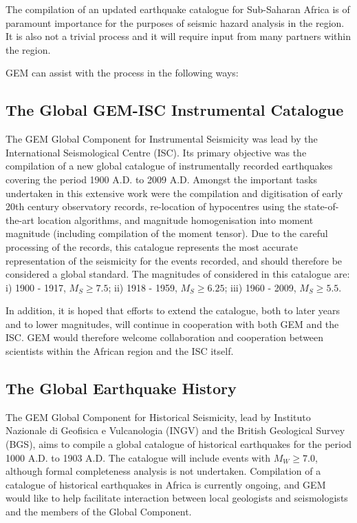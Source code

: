 The compilation of an updated earthquake catalogue for Sub-Saharan Africa is of paramount importance for the purposes of seismic hazard analysis in the region. It is also not a trivial process and it will require input from many partners within the region. 

GEM can assist with the process in the following ways:

\subsection{The Global GEM-ISC Instrumental Catalogue}

The GEM Global Component for Instrumental Seismicity was lead by the International Seismological Centre (ISC). Its primary objective was the compilation of a new global catalogue of instrumentally recorded earthquakes covering the period 1900 A.D. to 2009 A.D. Amongst the important tasks undertaken in this extensive work were the compilation and digitisation of early 20th century observatory records, re-location of hypocentres using the state-of-the-art location algorithms, and magnitude homogenisation into moment magnitude (including compilation of the moment tensor). Due to the careful processing of the records, this catalogue represents the most accurate representation of the seismicity for the events recorded, and should therefore be considered a global standard. The magnitudes of considered in this catalogue are: i) 1900 - 1917, $M_S \geq 7.5$; ii) 1918 - 1959, $M_S \geq 6.25$; iii) 1960 - 2009, $M_S \geq 5.5$. 

In addition, it is hoped that efforts to extend the catalogue, both to later years and to lower magnitudes, will continue in cooperation with both GEM and the ISC. GEM would therefore welcome collaboration and cooperation between scientists within the African region and the ISC itself.

\subsection{The Global Earthquake History}

The GEM Global Component for Historical Seismicity, lead by Instituto Nazionale di Geofisica e Vulcanologia (INGV) and the British Geological Survey (BGS), aims to compile a global catalogue of historical earthquakes for the period 1000 A.D. to 1903 A.D.  The catalogue will include events with $M_W \geq 7.0$, although formal completeness analysis is not undertaken. Compilation of a catalogue of historical earthquakes in Africa is currently ongoing, and GEM would like to help facilitate interaction between local geologists and seismologists and the members of the Global Component.

